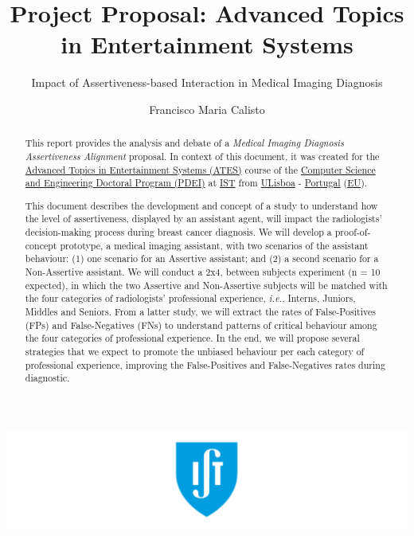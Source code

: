 \documentclass[sigchi]{acmart}
\begin{document}
\title{\normalsize Project Proposal: Advanced Topics in Entertainment Systems}
\subtitle{Impact of Assertiveness-based Interaction in Medical Imaging Diagnosis}

\author{Francisco Maria Calisto}

\renewcommand{\shortauthors}{Calisto}


\begin{abstract}

This report provides the analysis and debate of a \textit{Medical Imaging Diagnosis Assertiveness Alignment} proposal.
In context of this document, it was created for the \hyperlink{https://fenix.tecnico.ulisboa.pt/disciplinas/TASE4/2019-2020/2-semestre}{Advanced Topics in Entertainment Systems (ATES)} course of the \hyperlink{https://fenix.tecnico.ulisboa.pt/cursos/deic/curriculo}{Computer Science and Engineering Doctoral Program (PDEI)} at \hyperlink{https://tecnico.ulisboa.pt/en/}{IST} from \hyperlink{https://www.ulisboa.pt/}{ULisboa} - \hyperlink{https://www.portugal.gov.pt/en/}{Portugal} (\hyperlink{https://europa.eu}{EU}).

This document describes the development and concept of a study to understand how the level of assertiveness, displayed by an assistant agent, will impact the radiologists' decision-making process during breast cancer diagnosis.
We will develop a proof-of-concept prototype, a medical imaging assistant, with two scenarios of the assistant behaviour:
(1) one scenario for an Assertive assistant; and
(2) a second scenario for a Non-Assertive assistant.
We will conduct a 2x4, between subjects experiment (n = 10 expected), in which the two Assertive and Non-Assertive subjects will be matched with the four categories of radiologists' professional experience, {\it i.e.}, Interns, Juniors, Middles and Seniors.
From a latter study, we will extract the rates of False-Positives (FPs) and False-Negatives (FNs) to understand patterns of critical behaviour among the four categories of professional experience.
In the end, we will propose several strategies that we expect to promote the unbiased behaviour per each category of professional experience, improving the False-Positives and False-Negatives rates during diagnostic.

\end{abstract}

\begin{teaserfigure}
\includegraphics[width=\textwidth]{teaser}
\end{teaserfigure}


\maketitle



\break



\end{document}
